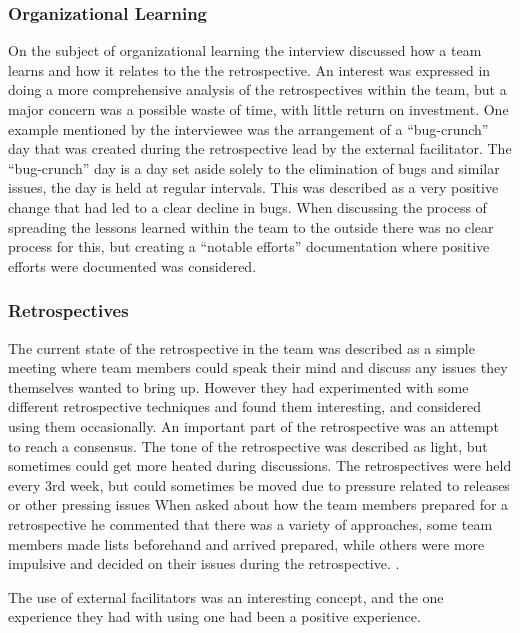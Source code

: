 \subsubsection{Organizational Learning}
On the subject of organizational learning the interview discussed how a team learns and how it relates to the the retrospective. An interest was expressed in doing a more comprehensive analysis of the retrospectives within the team, but a major concern was a possible waste of time, with little return on investment. One example mentioned by the interviewee was the arrangement of a ``bug-crunch'' day that was created during the retrospective lead by the external facilitator. The ``bug-crunch'' day is a day set aside solely to the elimination of bugs and similar issues, the day is held at regular intervals. This was described as a very positive change that had led to a clear decline in bugs. When discussing the process of spreading the lessons learned within the team to the outside there was no clear process for this, but creating a ``notable efforts'' documentation where positive efforts were documented was considered. 

\subsubsection{Retrospectives}
The current state of the retrospective in the team was described as a simple meeting where team members could speak their mind and discuss any issues they themselves wanted to bring up. However they had experimented with some different retrospective techniques and found them interesting, and considered using them occasionally. An important part of the retrospective was an attempt to reach a consensus. The tone of the retrospective was described as light, but sometimes could get more heated during discussions. The retrospectives were held every 3rd week, but could sometimes be moved due to pressure related to releases or other pressing issues
When asked about how the team members prepared for a retrospective he commented that there was a variety of approaches, some team members made lists beforehand and arrived prepared, while others were more impulsive and decided on their issues during the retrospective. . 

The use of external facilitators was an interesting concept, and the one experience they had with using one had been a positive experience.


